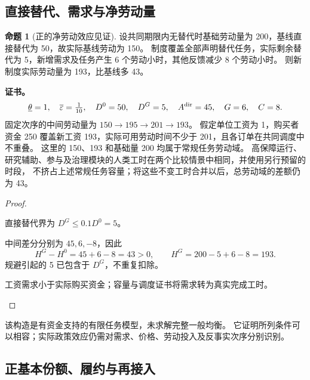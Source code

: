\documentclass[UTF8,12pt,a4paper,openany,fontset=none,zihao=false]{ctexrep}
\theoremstyle{definition}
\newtheorem{proposition}{命题}[chapter]
\newenvironment{certificate}{\par\noindent\textbf{证书。}\ignorespaces}{\par}
\newcommand{\1}{\mathbf 1}
\begin{document}
\subsection{直接替代、需求与净劳动量}

\begin{proposition}[正的净劳动效应见证]
设共同期限内无替代时基础劳动量为 200，基线直接替代为 50，故实际基线劳动为 150。
制度覆盖全部声明替代任务，实际剩余替代为 5，新增需求及任务产生 6 个劳动小时，其他反馈减少 8 个劳动小时。
则新制度实际劳动量为 193，比基线多 43。
\end{proposition}
\begin{certificate}
\[
\underline\theta=1,\quad\overline\varepsilon=\tfrac1{10},
\quad D^0=50,\quad D^G=5,
\quad A^{\rm dir}=45,\quad G=6,\quad C=8.
\]
固定次序的中间劳动量为 \(150\to195\to201\to193\)。
假定单位工资为 1，购买者资金 250 覆盖新工资 193，实际可用劳动时间不少于 201，且各订单在共同调度中不重叠。
这里的 150、193 和基础量 200 均属于常规任务劳动域。
高保障运行、研究辅助、参与及治理模块的人类工时在两个比较情景中相同，并使用另行预留的时段，
不挤占上述常规任务容量；将这些不变工时合并以后，总劳动域的差额仍为 43。
\end{certificate}
\begin{proof}
\begin{semanticsteps}
\item 直接替代界为 \(D^G\le0.1D^0=5\)。
\item 中间差分分别为 \(45,6,-8\)，因此
\[
H^G-H^0=45+6-8=43>0,
\qquad H^G=200-5+6-8=193.
\]
规避引起的 5 已包含于 \(D^G\)，不重复扣除。
\item 工资需求小于实际购买资金；容量与调度证书将需求转为真实完成工时。
\end{semanticsteps}
\end{proof}

该构造是有资金支持的有限任务模型，未求解完整一般均衡。
它证明所列条件可以相容；实际政策效应仍需对需求、价格、劳动投入及反事实次序分别识别。

\subsection{正基本份额、履约与再接入}
\end{document}
